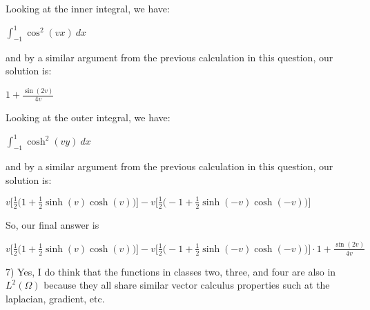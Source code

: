 \documentclass[executivepaper]{article}
\begin{document}
\begin{flushleft}
\begin{center}
\end{center}

Looking at the inner integral, we have:

\begin{center}

$\int_{-1}^{1} \cos^2(vx) \ dx$

\end{center}

and by a similar argument from the previous calculation in this question, our solution is:

\pagebreak

\vspace*{-40mm}

\begin{center}

$1 + \frac{\sin(2v)}{4v}$

\end{center}

Looking at the outer integral, we have:

\begin{center}

$\int_{-1}^{1} \cosh^2(vy) \ dx$

\end{center}

and by a similar argument from the previous calculation in this question, our solution is:

\begin{center}

$v \bigg[\frac{1}{2} \bigg(1+\frac{1}{2}\sinh(v)\cosh(v)\bigg) \bigg]-v \bigg[\frac{1}{2} \bigg(-1+\frac{1}{2}\sinh(-v)\cosh(-v)\bigg) \bigg]$

\end{center}

So, our final answer is

\begin{center}

$v \bigg[\frac{1}{2} \bigg(1+\frac{1}{2}\sinh(v)\cosh(v)\bigg) \bigg]-v \bigg[\frac{1}{2} \bigg(-1+\frac{1}{2}\sinh(-v)\cosh(-v)\bigg) \bigg] \cdot 1 + \frac{\sin(2v)}{4v}$

\end{center}

\end{flushleft}

\begin{flushleft}

7) Yes, I do think that the functions in classes two, three, and four are also in $L^2(\Omega)$ because they all share similar vector calculus properties such at the laplacian, gradient, etc.

\end{flushleft}
\end{document}
